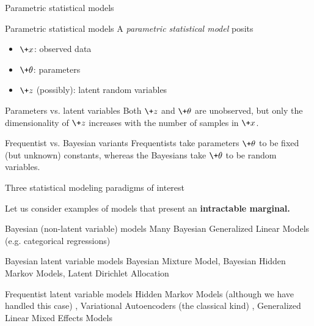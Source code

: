 \documentclass[10pt]{beamer}
\begin{document}
\begin{frame}{Parametric statistical models}

\begin{block}{Parametric statistical models}
A \textit{parametric statistical model} posits 
\begin{itemize}
\item $\+x$: observed data 
\item $\+\theta$: parameters 
\item  $\+z$ (possibly): latent random variables 
\end{itemize}
\end{block}

\vfill 
{}
\begin{block}{Parameters vs. latent variables}
Both $\+z$ and $\+\theta$ are unobserved, but only the dimensionality of $\+z$ increases with the number of samples in $\+x$.   
\end{block}


\vfill 
{}
\begin{block}{Frequentist vs. Bayesian variants}
Frequentists take parameters $\+\theta$  to be fixed (but unknown) constants, whereas the Bayesians take $\+\theta$ to be random variables. %
\end{block} 

\end{frame}


\begin{frame}{Three statistical modeling paradigms of interest}

Let us consider examples of models that present an \bf{intractable marginal}.
 
\begin{block}{Bayesian (non-latent variable) models}
Many Bayesian Generalized Linear Models (e.g. categorical regressions)
\end{block}
\pause 
{}
\begin{block}{Bayesian latent variable models}
Bayesian Mixture Model, Bayesian Hidden Markov Models, Latent Dirichlet Allocation  %
\end{block}
\pause 
{}
\begin{block}{Frequentist latent variable models}
Hidden Markov Models \tiny (although we have handled this case)  \normalsize , Variational Autoencoders \tiny (the classical kind) \normalsize, Generalized Linear Mixed Effects Models
\end{block}
\end{frame}
\end{document}

